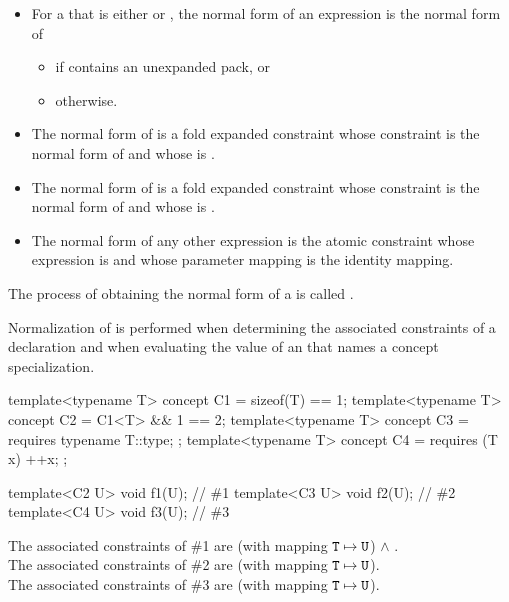 \begin{itemize}
\item
For a 
that is either \tcode{\&\&} or \tcode{||},
the normal form of an expression
is the normal form of
\begin{itemize}
\item
{}
if  contains an unexpanded pack, or
\item
{}
otherwise.
\end{itemize}

\item
The normal form of  is
a fold expanded constraint
whose constraint is the normal form of  and
whose  is \tcode{\&\&}.

\item
The normal form of  is
a fold expanded constraint
whose constraint is the normal form of  and
whose  is \tcode{||}.

\item
The normal form of any other expression  is
the atomic constraint
whose expression is  and
whose parameter mapping is the identity mapping.
\end{itemize}

\pnum
The process of obtaining the normal form of a
is called
.
\begin{note}
Normalization of 
is performed
when determining the associated constraints
of a declaration
and
when evaluating the value of an 
that names a concept specialization.
\end{note}

\pnum
\begin{example}
\begin{codeblock}
template<typename T> concept C1 = sizeof(T) == 1;
template<typename T> concept C2 = C1<T> && 1 == 2;
template<typename T> concept C3 = requires { typename T::type; };
template<typename T> concept C4 = requires (T x) { ++x; };

template<C2 U> void f1(U);      // \#1
template<C3 U> void f2(U);      // \#2
template<C4 U> void f3(U);      // \#3
\end{codeblock}
The associated constraints of \#1 are
 (with mapping $\texttt{\protect T} \mapsto \texttt{\protect U}$) $\land$ .\\
The associated constraints of \#2 are
 (with mapping $\texttt{\protect T} \mapsto \texttt{\protect U}$).\\
The associated constraints of \#3 are
 (with mapping $\texttt{\protect T} \mapsto \texttt{\protect U}$).
\end{example}

